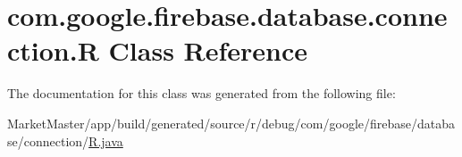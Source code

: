 \hypertarget{classcom_1_1google_1_1firebase_1_1database_1_1connection_1_1R}{}\section{com.\+google.\+firebase.\+database.\+connection.\+R Class Reference}
\label{classcom_1_1google_1_1firebase_1_1database_1_1connection_1_1R}


The documentation for this class was generated from the following file\+:\begin{DoxyCompactItemize}
\item 
Market\+Master/app/build/generated/source/r/debug/com/google/firebase/database/connection/\mbox{\hyperlink{debug_2com_2google_2firebase_2database_2connection_2R_8java}{R.\+java}}\end{DoxyCompactItemize}

